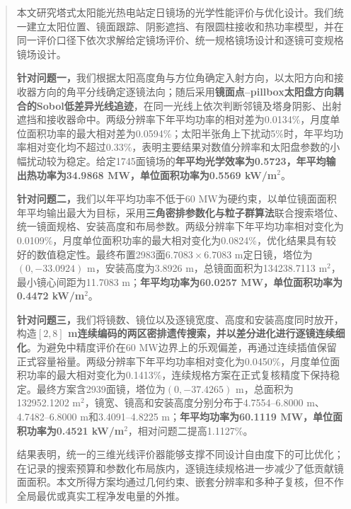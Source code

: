 \begin{abstract}
本文研究塔式太阳能光热电站定日镜场的光学性能评价与优化设计。我们统一建立太阳位置、镜面跟踪、阴影遮挡、有限圆柱接收和热功率模型，并在同一评价口径下依次求解给定镜场评价、统一规格镜场设计和逐镜可变规格镜场设计。

\textbf{针对问题一，}我们根据太阳高度角与方位角确定入射方向，以太阳方向和接收器方向的角平分线确定逐镜法向；随后采用\textbf{镜面点--pillbox太阳盘方向耦合的Sobol低差异光线追迹}，在同一光线上依次判断邻镜及塔身阴影、出射遮挡和接收器命中。两级分辨率下年平均功率的相对差为0.0134\%，月度单位面积功率的最大相对差为0.0594\%；太阳半张角上下扰动5\%时，年平均功率相对变化均不超过0.33\%，表明主要结果对数值分辨率和太阳盘参数的小幅扰动较为稳定。给定1745面镜场的\textbf{年平均光学效率为0.5723，年平均输出热功率为34.9868 MW，单位面积功率为0.5569 kW/m$^2$}。

\textbf{针对问题二，}我们以年平均功率不低于60 MW为硬约束，以单位镜面面积年平均输出最大为目标，采用\textbf{三角密排参数化与粒子群算法}联合搜索塔位、统一镜面规格、安装高度和布局参数。两级分辨率下年平均功率相对变化为0.0109\%，月度单位面积功率的最大相对变化为0.0824\%，优化结果具有较好的数值稳定性。最终布置2983面$6.7083\times6.7083$ m定日镜，塔位为$(0,-33.0924)$ m，安装高度为3.8926 m，总镜面面积为134238.7113 m$^2$，最小镜心间距为11.7083 m；\textbf{年平均功率为60.0257 MW，单位面积功率为0.4472 kW/m$^2$}。

\textbf{针对问题三，}我们将镜数、镜位以及逐镜宽度、高度和安装高度同时放开，构造\textbf{$[2,8]$ m连续编码的两区密排遗传搜索，并以差分进化进行逐镜连续细化}。为避免中精度评价在60 MW边界上的乐观偏差，再通过连续插值保留正式容量裕量。两级分辨率下年平均功率相对变化为0.0450\%，月度单位面积功率的最大相对变化为0.1413\%，连续规格方案在正式复核精度下保持稳定。最终方案含2939面镜，塔位为$(0,-37.4265)$ m，总面积为132952.1202 m$^2$，镜宽、镜高和安装高度分别分布于4.7554--6.8000 m、4.7482--6.8000 m和3.4091--4.8225 m；\textbf{年平均功率为60.1119 MW，单位面积功率为0.4521 kW/m$^2$}，相对问题二提高1.1127\%。

结果表明，统一的三维光线评价器能够支撑不同设计自由度下的可比优化；在记录的搜索预算和参数化布局族内，逐镜连续规格进一步减少了低贡献镜面面积。本文所得方案均通过几何约束、嵌套分辨率和多种子复核，但不作全局最优或真实工程净发电量的外推。

\end{abstract}

